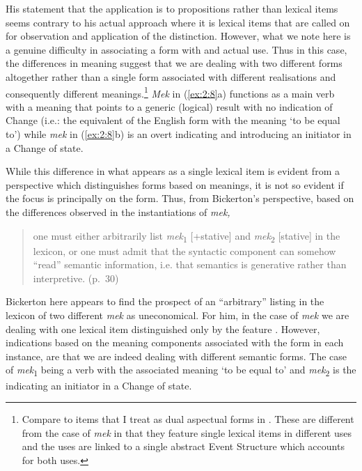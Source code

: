 His statement that the application is to propositions rather than
lexical items seems contrary to his actual approach where it is
lexical items that are called on for observation and application of
the distinction.  However, what we note here is a genuine difficulty
in associating a form with  and actual use.  Thus
in this case, the differences in meaning suggest that we are dealing
with two different forms altogether rather than a single form
associated with different realisations and consequently different
meanings.\footnote{Compare to items that I treat as dual aspectual
  forms in . These are different from the case of
  \textit{mek} in that they feature single lexical items in different
  uses and the uses are linked to a single abstract Event Structure
  which accounts for both uses.}  \textit{Mek} in (\ref{ex:2:8}a)
functions as a main verb with a meaning that points to a generic
(logical) result with no indication of Change (i.e.: the equivalent of
the English form with the meaning `to be equal to') while \textit{mek}
in (\ref{ex:2:8}b) is an overt  indicating and
introducing an initiator \CAUSE in a Change of state.

While this difference in what appears as a single lexical item is
evident from a perspective which distinguishes forms based on
meanings, it is not so evident if the focus is principally on the
form.  Thus, from Bickerton’s perspective, based on the differences
observed in the instantiations of \textit{mek,}

\begin{quote}
one must either arbitrarily list \textit{mek}\textsubscript{1} [+stative] and \textit{mek}\textsubscript{2} [\textminus stative] in the
lexicon, or one must admit that the syntactic component can somehow
``read'' semantic information, i.e. that semantics is generative rather
than interpretive. (p.~30)
\end{quote}

Bickerton here appears to find the prospect of an ``arbitrary'' listing
in the lexicon of two different \textit{mek} as uneconomical.  For
him, in the case of \textit{mek} we are dealing with one lexical item
distinguished only by the feature .  However, indications
based on the meaning components associated with the form in each
instance, are that we are indeed dealing with different semantic
forms.  The case of \textit{mek}\textsubscript{1} being a verb with
the associated meaning `to be equal to' and
\textit{mek}\textsubscript{2} is the  indicating an
initiator in a Change of state.

